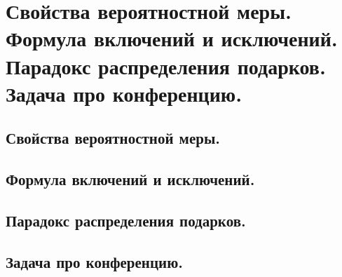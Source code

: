 \section{Свойства вероятностной меры. Формула включений и исключений. Парадокс распределения подарков. Задача про конференцию.}

\subsection{Свойства вероятностной меры.}

\subsection{Формула включений и исключений.}

\subsection{Парадокс распределения подарков.}

\subsection{Задача про конференцию.}
